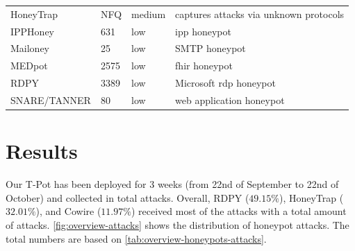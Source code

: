 \begin{table}
\begin{tabularx}{\linewidth}{l|XlX}
        HoneyTrap \cite{honeytrap2021}            & NFQ                                                                                                         & medium                     & captures attacks via unknown protocols                                               \\
        IPPHoney \cite{ipphoney2021}              & 631                                                                                                         & low                        & \ac{ipp} honeypot                                                                    \\
        Mailoney \cite{mailoney2021}              & 25                                                                                                          & low                        & SMTP honeypot                                                                        \\
        MEDpot \cite{medpot2021}                  & 2575                                                                                                        & low                        & \ac{fhir} honeypot                                                                   \\
        RDPY \cite{rdpy2021}                      & 3389                                                                                                        & low                        & Microsoft \ac{rdp} honeypot                                                          \\
        SNARE/TANNER \cite{snare2021}             & 80                                                                                                          & low                        & web application honeypot                                                             \\
        \bottomrule
    \end{tabularx}
    \label{tab:overview-honeypots}
\end{table}

\section{Results}
\label{sec:honeypots-heicloud}

Our T-Pot has been deployed for 3 weeks (from 22nd of September to 22nd of October) and collected in total  attacks.
Overall, RDPY ($49.15\%$), HoneyTrap ($32.01\%$), and Cowire ($11.97\%$) received most of the attacks with a total amount of  attacks.
\autoref{fig:overview-attacks} shows the distribution of honeypot attacks.
The total numbers are based on \autoref{tab:overview-honeypots-attacks}.

